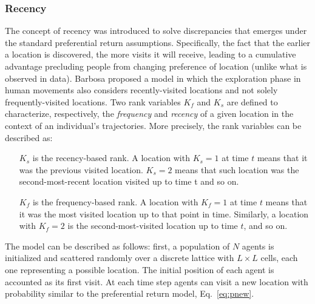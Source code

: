 \subsubsection{Recency}
\label{sec:recency}
The concept of recency was introduced to solve discrepancies that emerges under the standard preferential return assumptions. Specifically, the fact that the earlier a location is discovered, the more visits it will receive, leading to a cumulative advantage precluding people from changing preference of location (unlike what is observed in data). Barbosa \et \cite{barbosa_2015_effect} proposed a model in which the exploration phase in human movements also considers recently-visited locations and not solely frequently-visited locations. Two rank variables $K_{f}$ and $K_{s}$ are defined to characterize, respectively, the \emph{frequency} and \emph{recency} of a given location in the context of an individual's trajectories. More precisely, the rank variables can be described as:
\begin{itemize}
	\item[$K_s$] is the recency-based rank. A location with $K_s = 1$ at time $t$ means that it was the previous visited location. $K_s = 2$ means that such location was the second-most-recent location visited up to time t and so on.
	\item[$K_f$] is the frequency-based rank. A location with $K_f =1$ at time $t$ means that it was the most visited location up to that point in time. Similarly, a location with $K_f = 2$ is the second-most-visited location up to time $t$, and so on.
\end{itemize} 

The model can be described as follows: first, a population of $N$ agents is initialized and scattered randomly over a discrete lattice with $L\times L$ cells, each one representing a possible location. The initial position of each agent is accounted as its first visit. At each time step agents can visit a new location with probability similar to the preferential return model, Eq.~\eqref{eq:pnew}. 

